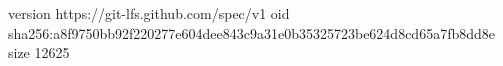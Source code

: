 version https://git-lfs.github.com/spec/v1
oid sha256:a8f9750bb92f220277e604dee843c9a31e0b35325723be624d8cd65a7fb8dd8e
size 12625
